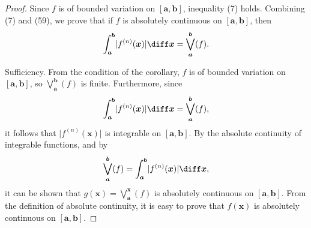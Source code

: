 \documentclass{ijclclp}
\begin{document}
\begin{proof}
    Since \(f\) is of bounded variation on \([\boldsymbol{a},\boldsymbol{b}]\), inequality (7) holds. Combining (7) and (59), we prove that if \(f\) is absolutely continuous on \([\boldsymbol{a},\boldsymbol{b}]\), then
    \[\int_{\boldsymbol{a}}^{\boldsymbol{b}}\lvert f^{(n)}(\boldsymbol{x})\rvert\diff \boldsymbol{x}=\bigvee_{\boldsymbol{a}}^{\boldsymbol{b}}(f).\]

    Sufficiency. From the condition of the corollary, \(f\) is of bounded variation on \([\boldsymbol{a},\boldsymbol{b}]\), so \(\bigvee\limits_{\boldsymbol{a}}^{\boldsymbol{b}}(f)\) is finite. Furthermore, since
    \[\int_{\boldsymbol{a}}^{\boldsymbol{b}}\lvert f^{(n)}(\boldsymbol{x})\rvert\diff \boldsymbol{x}=\bigvee_{\boldsymbol{a}}^{\boldsymbol{b}}(f),\]
    it follows that \(\lvert f^{(n)}(\boldsymbol{x})\rvert\) is integrable on \([\boldsymbol{a},\boldsymbol{b}]\). 
    By the absolute continuity of integrable functions, and by
    \[\bigvee_{\boldsymbol{a}}^{\boldsymbol{b}}(f)=\int_{\boldsymbol{a}}^{\boldsymbol{b}}\lvert f^{(n)}(\boldsymbol{x})\rvert\diff \boldsymbol{x},\]
    it can be shown that \(g(\boldsymbol{x})=\bigvee\limits_{\boldsymbol{a}}^{\boldsymbol{x}}(f)\) is absolutely continuous on \([\boldsymbol{a},\boldsymbol{b}]\). 
    From the definition of absolute continuity, it is easy to prove that \(f(\boldsymbol{x})\) is absolutely continuous on \([\boldsymbol{a},\boldsymbol{b}]\).
\end{proof}
\end{document}
